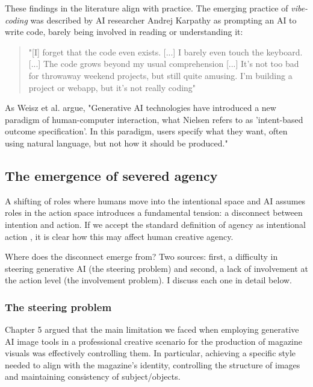 These findings in the literature align with practice. The emerging practice of \textit{vibe-coding} was described by AI researcher Andrej Karpathy as prompting an AI to write code, barely being involved in reading or
understanding it:

\begin{quote}
"[I] forget that the code even exists. [...] I barely even touch the keyboard.
[...] The code grows beyond my usual comprehension [...] It's not too bad for
throwaway weekend projects, but still quite amusing. I'm building a project
or webapp, but it's not really coding"
\end{quote}



As Weisz et al. \cite{Weisz2024-io} argue, "Generative AI technologies have introduced a new paradigm of human-computer interaction, what Nielsen refers to as 'intent-based outcome specification'. In this paradigm, users specify what they want, often using natural language, but not how it should be produced."

\subsection{The emergence of severed agency}

A shifting of roles where humans move into the intentional space and AI assumes roles
in the action space introduces a fundamental tension: a disconnect between intention and
action. If we accept the standard definition of agency as intentional action \cite{Schlosser2019-jk}, it is clear how this may affect human creative agency.

Where does the disconnect emerge from? Two sources: first, a difficulty in steering generative AI (the steering problem) and second, a lack of involvement at the action level (the involvement problem). I discuss each one in detail below. 

\subsubsection{The steering problem}

Chapter 5 argued that the main limitation we faced when employing generative AI image tools in a professional creative scenario for the production of magazine visuals was effectively controlling them. In particular, achieving a specific style needed to align with the magazine's identity, controlling the structure of images and maintaining consistency of subject/objects. 

